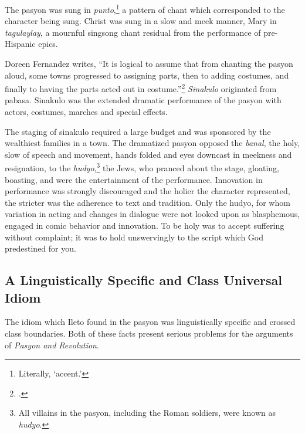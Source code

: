 The pasyon was sung in \textit{punto},\footnote{Literally, \enquote*{accent.}} a pattern of chant which corresponded to the character being sung. Christ was sung in a slow and meek manner, Mary in \textit{tagulaylay}, a mournful singsong chant residual from the performance of pre-Hispanic epics.

Doreen Fernandez writes, \enquote{It is logical to assume that from chanting the pasyon aloud, some towns progressed to assigning parts, then to adding costumes, and finally to having the parts acted out in costume.}\footcite[16]{Fernandez1996} \textit{Sinakulo }originated from pabasa. Sinakulo was the extended dramatic performance of the pasyon with actors, costumes, marches and special effects.

The staging of sinakulo required a large budget and was sponsored by the wealthiest families in a town. The dramatized pasyon opposed the \textit{banal}, the holy, slow of speech and movement, hands folded and eyes downcast in meekness and resignation, to the \textit{hudyo},\footnote{All villains in the pasyon, including the Roman soldiers, were known as \textit{hudyo}.} the Jews, who pranced about the stage, gloating, boasting, and were the entertainment of the performance. Innovation in performance was strongly discouraged and the holier the character represented, the stricter was the adherence to text and tradition. Only the hudyo, for whom variation in acting and changes in dialogue were not looked upon as blasphemous, engaged in comic behavior and innovation. To be holy was to accept suffering without complaint; it was to hold unswervingly to the script which God predestined for you.

\subsection{A Linguistically Specific and Class Universal Idiom}

The idiom which Ileto found in the pasyon was linguistically specific and crossed class boundaries. Both of these facts present serious problems for the arguments of \textit{Pasyon and Revolution}.

